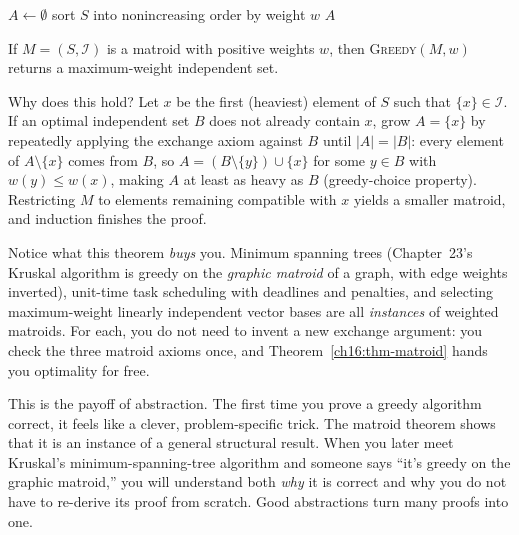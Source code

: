 \begin{algorithm}[H]
\caption{\textsc{Greedy}($M, w$)}
$A \leftarrow \emptyset$\;
sort $S$ into nonincreasing order by weight $w$\;
\Return $A$
\end{algorithm}

\begin{theorem}
\label{ch16:thm-matroid}
If $M = (S, \mathcal{I})$ is a matroid with positive weights $w$, then
\textsc{Greedy}$(M, w)$ returns a maximum-weight independent set.
\end{theorem}

Why does this hold? Let $x$ be the first (heaviest) element of $S$ such that
$\{x\} \in \mathcal{I}$. If an optimal independent set $B$ does not already
contain $x$, grow $A = \{x\}$ by repeatedly applying the exchange axiom against
$B$ until $|A| = |B|$: every element of $A \setminus \{x\}$ comes from $B$, so
$A = (B \setminus \{y\}) \cup \{x\}$ for some $y \in B$ with $w(y) \le w(x)$,
making $A$ at least as heavy as $B$ (greedy-choice property). Restricting $M$ to
elements remaining compatible with $x$ yields a smaller matroid, and induction
finishes the proof.

Notice what this theorem \emph{buys} you. Minimum spanning trees (Chapter~23's
Kruskal algorithm is greedy on the \emph{graphic matroid} of a graph, with edge
weights inverted), unit-time task scheduling with deadlines and penalties, and
selecting maximum-weight linearly independent vector bases are all
\emph{instances} of weighted matroids. For each, you do not need to invent a new
exchange argument: you check the three matroid axioms once, and
Theorem~\ref{ch16:thm-matroid} hands you optimality for free.

\begin{aestheticbox}
This is the payoff of abstraction. The first time you prove a greedy algorithm
correct, it feels like a clever, problem-specific trick. The matroid theorem
shows that it is an instance of a general structural result. When
you later meet Kruskal's minimum-spanning-tree algorithm and someone says ``it's
greedy on the graphic matroid,'' you will understand both \emph{why} it is
correct and why you do not have to re-derive its proof from scratch. Good
abstractions turn many proofs into one.
\end{aestheticbox}

